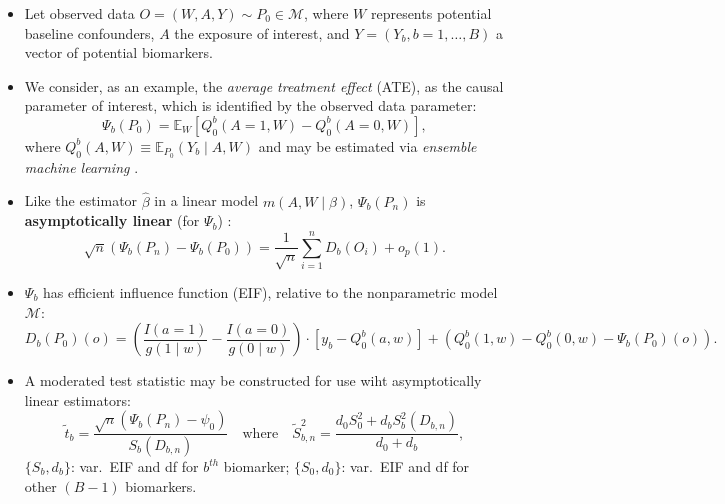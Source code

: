 \documentclass[landscape,a0paper,fontscale=0.285]{baposter} %
\newcommand{\compresslist}{ %
\setlength{\itemsep}{1pt}
\setlength{\parskip}{0pt}
\setlength{\parsep}{0pt}
}
\newcommand{\E}{\mathbb{E}}
\newcommand{\M}{\mathcal{M}}
\newcommand{\1}{\mathbbm{1}}
\begin{document}
\begin{poster}
{\begin{itemize}
  \itemsep0.50pt
  \item Let observed data $O = (W, A, Y) \sim P_0 \in \M$, where $W$ represents
      potential baseline confounders, $A$ the exposure of interest, and
      $Y = ({Y_b}, b = 1, \dots, B)$ a vector of potential biomarkers.
  \item We consider, as an example, the \textit{average treatment effect} (ATE),
      as the causal parameter of interest, which is identified by the observed
      data parameter:
      \begin{equation}\label{ate}
        \Psi_b(P_0) = \E_W[ Q_0^b(A = 1, W) - Q_0^b(A = 0, W)],
      \end{equation}
        where $Q_0^b(A, W) \equiv \E_{P_0}(Y_b \mid A, W)$ and may be estimated
        via \textit{ensemble machine learning}
        \cite{vdl2007super,breiman1996stacked,wolpert1992stacked}.
  \item Like the estimator $\hat{\beta}$ in a linear model $m(A,W \mid \beta)$,
      $\Psi_b(P_n)$ is \textbf{asymptotically linear} (for $\Psi_b$)
      \cite{vdl2011targeted}:
      \begin{equation}\label{asymp_lin}
        \sqrt{n} (\Psi_b(P_n) - \Psi_b(P_0)) = \frac{1}{\sqrt{n}} \sum_{i=1}^n
        D_b(O_i) + o_p(1).
      \end{equation}
  \item $\Psi_b$ has efficient influence function (EIF), relative to the
      nonparametric model $\M$:
      \begin{equation}\label{eif_ate}
        D_b(P_0)(o) = \left(\frac{I(a = 1)}{g(1 \mid w)} -
        \frac{I(a = 0)}{g(0 \mid w)}\right) \cdot \left[y_b - Q_0^b(a, w)\right]
        + \left(Q_0^b(1, w) - Q_0^b(0, w) - \Psi_b(P_0)(o)\right).
      \end{equation}
  \item A moderated test statistic \cite{smyth2004linear,smyth2005limma,
      hejazi2018+supervised} may be constructed for use wiht asymptotically
      linear estimators:
      \begin{equation}\label{mod_eif}
        \tilde{t}_b = \frac{\sqrt{n}(\Psi_b(P_n) - \psi_0)}{S_b(D_{b,n})}
        \quad \text{where} \quad
        \tilde{S}_{b,n}^2 = \frac{d_0S_0^2 + d_bS_b^2(D_{b,n})}{d_0 + d_b},
      \end{equation}
    $\{S_b, d_b\}$: var.~EIF and df for $b^{th}$ biomarker;
    $\{S_0, d_0\}$: var.~EIF and df for other $(B-1)$ biomarkers.
\end{itemize}

}


\end{poster}
\end{document}
